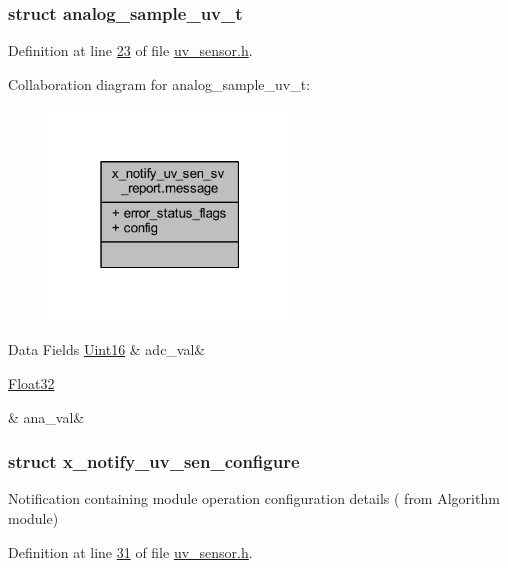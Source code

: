 \subsubsection{struct analog\+\_\+sample\+\_\+uv\+\_\+t}


Definition at line \hyperlink{a00020_source_l00023}{23} of file \hyperlink{a00020_source}{uv\+\_\+sensor.\+h}.



Collaboration diagram for analog\+\_\+sample\+\_\+uv\+\_\+t\+:\nopagebreak
\begin{figure}[H]
\begin{center}
\leavevmode
\includegraphics[width=183pt]{d8/df7/a01711}
\end{center}
\end{figure}
\begin{DoxyFields}{Data Fields}
\hypertarget{a00020_a891d4fcb12960785cecc1e688681b748}{\hyperlink{a00072_a59a9f6be4562c327cbfb4f7e8e18f08b}{Uint16}}\label{a00020_a891d4fcb12960785cecc1e688681b748}
&
adc\+\_\+val&
\\
\hline

\hypertarget{a00020_a053a8ae0e59f7414929cd8ac3feeec7b}{\hyperlink{a00072_a87d38f886e617ced2698fc55afa07637}{Float32}}\label{a00020_a053a8ae0e59f7414929cd8ac3feeec7b}
&
ana\+\_\+val&
\\
\hline

\end{DoxyFields}
\label{dd/db2/a00866}
\hypertarget{a00020_dd/db2/a00866}{}
\subsubsection{struct x\+\_\+notify\+\_\+uv\+\_\+sen\+\_\+configure}
Notification containing module operation configuration details ( from Algorithm module) 

Definition at line \hyperlink{a00020_source_l00031}{31} of file \hyperlink{a00020_source}{uv\+\_\+sensor.\+h}.



